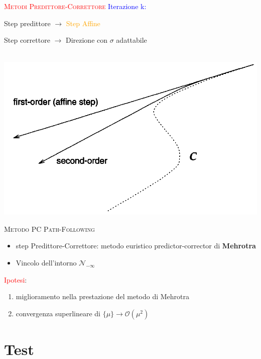 \begin{frame}{\textsc{\LARGE \textcolor{red}{Metodi Predittore-Correttore}}}
\pause
\textcolor{blue}{Iterazione k:}
\setcounter{elenco}{0}
\begin{list}{}{\setlength{\itemsep}{0.6cm}}
	\item Step predittore $\rightarrow$ \textcolor{orange}{Step Affine}
	\pause
	\item Step correttore $\rightarrow$ Direzione con $\sigma$ adattabile
	\end{list}
\\[1 cm]
\pause
\centering \includegraphics[width = 6 cm]{MEH.PNG}
\end{frame}


\begin{frame}[t]{\textsc{\LARGE \textcolor{sapphire}{Metodo PC Path-Following}}}
\begin{itemize}
\item step Predittore-Correttore: metodo euristico predictor-corrector di \textbf{Mehrotra}
\item Vincolo dell'intorno $\mathcal{N}_{-\infty}$
\end{itemize}
\pause
\textcolor{red}{Ipotesi}: 
\begin{enumerate}
	\item miglioramento nella prestazione del metodo di Mehrotra
	\item convergenza superlineare di $\{\mu\}\rightarrow \mathcal{O}(\mu^{2})$
\end{enumerate}
\end{frame}

\section{Test}


